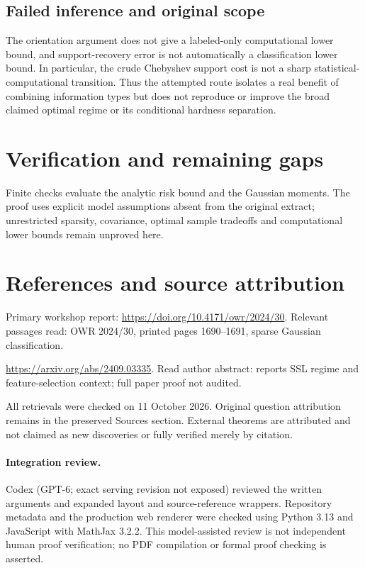 \documentclass[11pt]{article}
\begin{document}
\subsection{Failed inference and original scope}
The orientation argument does not give a labeled-only computational lower bound, and support-recovery error is not automatically a classification lower bound. In particular, the crude Chebyshev support cost is not a sharp statistical-computational transition. Thus the attempted route isolates a real benefit of combining information types but does not reproduce or improve the broad claimed optimal regime or its conditional hardness separation.
\section{Verification and remaining gaps}
Finite checks evaluate the analytic risk bound and the Gaussian moments. The proof uses explicit model assumptions absent from the original extract; unrestricted sparsity, covariance, optimal sample tradeoffs and computational lower bounds remain unproved here.

\section{References and source attribution}
Primary workshop report: \url{https://doi.org/10.4171/owr/2024/30}. Relevant passages read: OWR 2024/30, printed pages 1690--1691, sparse Gaussian classification.

\url{https://arxiv.org/abs/2409.03335}. Read author abstract: reports SSL regime and feature-selection context; full paper proof not audited.

All retrievals were checked on 11 October 2026. Original question attribution remains in the preserved Sources section. External theorems are attributed and not claimed as new discoveries or fully verified merely by citation.


\paragraph{Integration review.} Codex (GPT-6; exact serving revision not exposed) reviewed the written arguments and expanded layout and source-reference wrappers. Repository metadata and the production web renderer were checked using Python 3.13 and JavaScript with MathJax 3.2.2. This model-assisted review is not independent human proof verification; no PDF compilation or formal proof checking is asserted.
\end{document}
